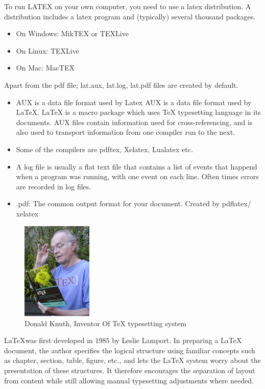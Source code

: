 To run LATEX on your own computer, you need  to use a latex distribution. A distribution includes a latex program and (typically) several thousand packages.
\begin{itemize}
  \item  On Windows: MikTEX or TEXLive
   \item On Linux: TEXLive
  \item  On Mac: MacTEX
\end{itemize}
Apart from the pdf file; lat.aux, lat.log, lat.pdf files are created by default.\\
\begin{itemize}
\item AUX is a data file format used by Latex
AUX is a data file format used by LaTeX. LaTeX is a macro package which uses TeX typesetting language in its documents. AUX files contain information used for cross-referencing, and is also used to transport information from one compiler run to the next.
\item Some of the compilers are pdftex, Xelatex, Lualatex etc.
\item A log file is usually a flat text file that contains a list of events that happend when a program was running, with one event on each line. Often times errors are recorded in log files.
\item .pdf: The common output format for your document.
Created by pdflatex/ xelatex
\end{itemize}
\begin{figure}[!ht]
\centering
\includegraphics[width=0.3\textwidth]{input/images/donald.png}                   
\caption{Donald Knuth, Inventor Of \TeX{} 
typesetting system}
\hspace{-1.5em}
\end{figure}
\LaTeX was first developed in 1985 by Leslie Lamport.
In preparing a \LaTeX{} document, the author 
specifies the logical structure using familiar concepts such as 
chapter, section, table, figure, etc., and lets the \LaTeX{} system 
worry about the presentation of these structures. It therefore 
encourages the separation of layout from content while still allowing 
manual typesetting adjustments where needed. 


